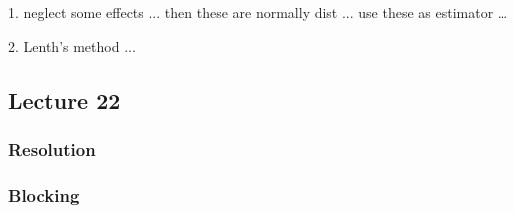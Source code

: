 1. neglect some effects ... then these are normally dist ... use these as estimator \dots

2. Lenth's method ...



\subsection*{Lecture  22}



\subsubsection*{Resolution}



\subsubsection*{Blocking}